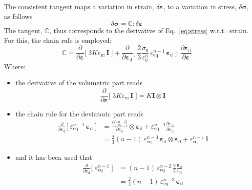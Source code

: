 \documentclass{goose-article}
\begin{document}
The consistent tangent maps a variation in strain, $\delta \bm{\varepsilon}$, to a variation in stress, $\delta \bm{\sigma}$, as follows
%
\begin{equation}
  \delta \bm{\sigma} = \mathbb{C} : \delta \bm{\varepsilon}
\end{equation}
%
The tangent, $\mathbb{C}$, thus corresponds to the derivative of Eq.~\eqref{eq:stress} w.r.t.\ strain. For this, the chain rule is employed:
%
\begin{equation}
  \mathbb{C}
  = \frac{\partial}{\partial \bm{\varepsilon}}
    \bigg[\;
      3 K \varepsilon_\mathrm{m} \, \bm{I}
    \;\bigg]
  + \frac{\partial}{\partial \bm{\varepsilon}_\mathrm{d}}
    \bigg[\;
      \frac{2}{3} \frac{\sigma_0}{\varepsilon_0^n} \,
      \varepsilon_\mathrm{eq}^{n-1} \, \bm{\varepsilon}_\mathrm{d}
    \;\bigg]
  : \frac{\partial \bm{\varepsilon}_\mathrm{d}}{\partial \bm{\varepsilon}}
\end{equation}
%
Where:
\begin{itemize}
%
\item the derivative of the volumetric part reads
%
\begin{equation}
  \frac{\partial}{\partial \bm{\varepsilon}}
  \bigg[\;
    3 K \varepsilon_\mathrm{m} \, \bm{I}
  \;\bigg]
  = K \bm{I} \otimes \bm{I}
\end{equation}
%
\item the chain rule for the deviatoric part reads
%
\begin{align}
  \frac{\partial}{\partial \bm{\varepsilon}_\mathrm{d}}
  \bigg[\;
    \varepsilon_\mathrm{eq}^{n-1} \, \bm{\varepsilon}_\mathrm{d}
  \;\bigg]
  &=
  \frac{
    \partial \big[ \varepsilon_\mathrm{eq}^{n-1} \big]
  }{
    \partial \bm{\varepsilon}_\mathrm{d}
  } \otimes \bm{\varepsilon}_\mathrm{d}
  + \varepsilon_\mathrm{eq}^{n-1}
  \frac{
    \partial \bm{\varepsilon}_\mathrm{d}
  }{
    \partial \bm{\varepsilon}_\mathrm{d}
  }
  \\
  &=
  \tfrac{2}{3} (n-1) \, \varepsilon_\mathrm{eq}^{n-3} \,
  \bm{\varepsilon}_\mathrm{d} \otimes \bm{\varepsilon}_\mathrm{d}
  + \varepsilon_\mathrm{eq}^{n-1} \, \mathbb{I}
\end{align}
%
\item and it has been used that
%
\begin{align}
  \frac{\partial}{\partial \bm{\varepsilon}_\mathrm{d}}
  \bigg[\;
    \varepsilon_\mathrm{eq}^{n-1}
  \;\bigg]
  &= (n-1)\, \varepsilon_\mathrm{eq}^{n-2} \,
  \frac{2}{3} \frac{\bm{\varepsilon}_\mathrm{d}}{\varepsilon_\mathrm{eq}}
  \\
  &= \tfrac{2}{3} (n-1) \,
    \varepsilon_\mathrm{eq}^{n-3} \, \bm{\varepsilon}_\mathrm{d}
\end{align}
%
\end{itemize}
%
\end{document}
